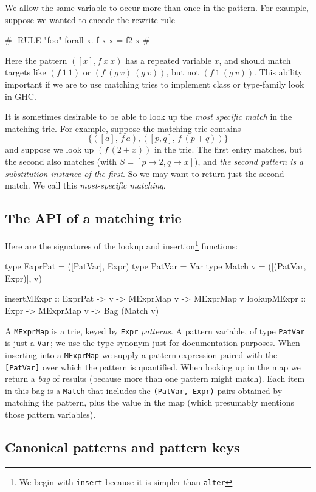 \documentclass[acmsmall]{acmart}
\theoremstyle{theorem}
\theoremstyle{definition}
\theoremstyle{remark}
\begin{document}
We allow the same variable to occur more than once in the pattern.
For example, suppose we wanted to encode the rewrite rule
\begin{code}
{#- RULE "foo" forall x. f x x = f2 x #-}
\end{code}
Here the pattern $([x], f~ x~ x)$ has a repeated variable $x$,
and should match targets like $(f~ 1~ 1)$ or $(f ~(g~ v)~ (g ~v))$,
but not $(f~ 1~ (g~ v))$.  This ability important if we are to use matching tries
to implement class or type-family look in GHC.

It is sometimes desirable to be able to look up the \emph{most specific match} in the matching trie.  For example, suppose the matching trie contains
$$
\{ ([a],\, f\, a), ([p,q],\, f\,(p+q)) \}
$$
and suppose we look up $(f\,(2+x))$ in the trie.  The first entry matches, but the second also matches (with $S = [p \mapsto 2, q \mapsto x]$), and \emph{the second pattern is a substitution instance of the first}.  So we may want to return just the second match.  We call this \emph{most-specific matching}.

\subsection{The API of a matching trie} \label{sec:match-api}

Here are the signatures of the lookup and insertion\footnote{We begin with \lstinline{insert}
  because it is simpler than \lstinline{alter}} functions:
\begin{code}
type ExprPat = ([PatVar], Expr)
type PatVar  = Var
type Match v = ([(PatVar, Expr)], v)

insertMExpr :: ExprPat -> v -> MExprMap v -> MExprMap v
lookupMExpr :: Expr -> MExprMap v -> Bag (Match v)
\end{code}
A \lstinline{MExprMap} is a trie, keyed by \lstinline{Expr} \emph{patterns}.
A pattern variable, of type \lstinline{PatVar} is just a \lstinline{Var}; we
use the type synonym just for documentation purposes. When inserting into a
\lstinline{MExprMap} we supply a pattern expression paired with the \lstinline{[PatVar]}
over which the pattern is quantified.  When looking up in the map we return a \emph{bag}
of results (because more than one pattern might match).  Each item in this bag is
a \lstinline{Match} that includes the \lstinline{(PatVar, Expr)} pairs obtained by
matching the pattern, plus the value in the map (which presumably mentions those
pattern variables).

\subsection{Canonical patterns and pattern keys}
\end{document}
